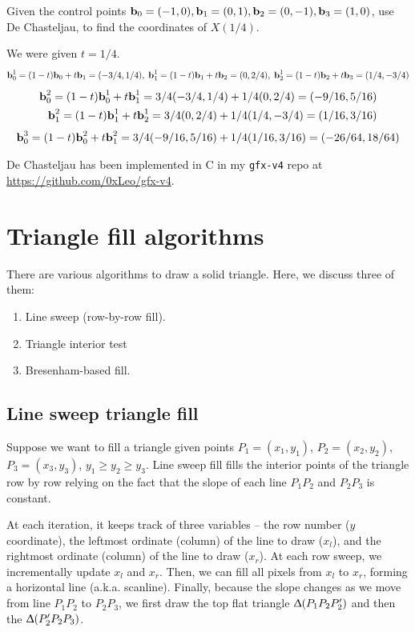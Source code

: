 \documentclass[a4paper]{article}
\begin{document}
\begin{exmp}
    Given the control points $\textbf{b}_0=(-1,0), \textbf{b}_1=(0,1), \textbf{b}_2=(0,-1), \textbf{b}_3=(1,0)$, use De Chasteljau, to find the coordinates of $X(1/4)$.
\end{exmp}
\begin{soln}
We were given $t=1/4$.
\[
    \textbf{b}_0^1 = (1-t)\textbf{b}_0 + t\textbf{b}_1 = (-3/4, 1/4), \; \textbf{b}_1^1 = (1-t)\textbf{b}_1 + t\textbf{b}_2 = (0, 2/4), \; \textbf{b}_2^1 = (1-t)\textbf{b}_2 + t\textbf{b}_3 = (1/4,-3/4)
\]
\begin{align*}
    \textbf{b}_0^2 = (1-t)\textbf{b}_0^1 + t\textbf{b}_1^1 = 3/4 (-3/4, 1/4) + 1/4(0,2/4) = (-9/16, 5/16)\\
    \textbf{b}_1^2 = (1-t)\textbf{b}_1^1 + t\textbf{b}_2^1 = 3/4 (0, 2/4) + 1/4(1/4,-3/4) = (1/16, 3/16)
\end{align*}
\begin{align*}
    \textbf{b}_0^3 = (1-t)\textbf{b}_0^2 + t\textbf{b}_1^2 = 3/4 (-9/16, 5/16) + 1/4(1/16, 3/16) = (-26/64, 18/64)
\end{align*}
\end{soln}
De Chasteljau has been implemented in C in my \texttt{gfx-v4} repo at \url{https://github.com/0xLeo/gfx-v4}.


\clearpage
\section{Triangle fill algorithms}

There are various algorithms to draw a solid triangle. Here, we discuss three of them:
\begin{enumerate}
    \item Line sweep (row-by-row fill).
    \item Triangle interior test
    \item Bresenham-based fill.
\end{enumerate}

\subsection{Line sweep triangle fill}

Suppose we want to fill a triangle given points $P_1=(x_1,y_1)$, $P_2=(x_2,y_2)$, $P_3=(x_3,y_3)$, $y_1 \geq y_2 \geq y_3$. Line sweep fill fills the interior points of the triangle row by row relying on the fact that the slope of each line $P_1P_2$ and $P_2P_3$ is constant.

At each iteration, it keeps track of three variables -- the row number ($y$ coordinate), the leftmost ordinate (column) of the line to draw ($x_l$), and  the rightmost ordinate (column) of the line to draw ($x_r$). At each row sweep, we incrementally update $x_l$ and $x_r$. Then, we can fill all pixels from $x_l$ to $x_r$, forming a horizontal line (a.k.a. scanline). Finally, because the slope changes as we move from line $P_1P_2$ to $P_2P_3$, we first draw the top flat triangle $\Updelta(P_1P_2P_2')$ and then the $\Updelta(P_2'P_2P_3)$. 
\end{document}
